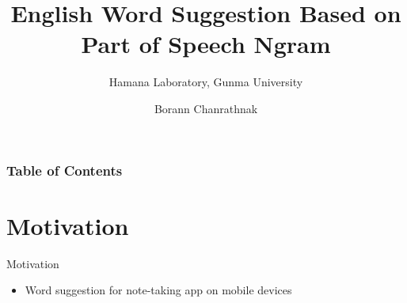 \documentclass{beamer}
\title{English Word Suggestion Based on Part of Speech Ngram}
\subtitle{Hamana Laboratory, Gunma University}
\author{Borann Chanrathnak}
\begin{document}
\maketitle


\begin{frame}
\frametitle{Table of Contents}
\tableofcontents
\end{frame}

\section{Motivation}
\begin{frame}{Motivation}
    \begin{itemize}
        \item Word suggestion for note-taking app on mobile devices
    \end{itemize}
    \centering
\end{frame}
\end{document}
